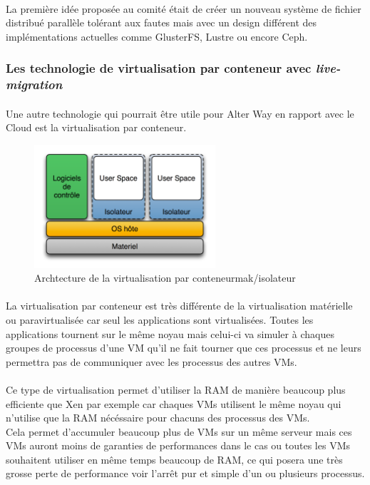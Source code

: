\paragraph*{}
La première idée proposée au comité était de créer un nouveau système de fichier distribué parallèle tolérant aux fautes mais avec un design différent des implémentations actuelles
comme GlusterFS, Lustre ou encore Ceph.


\subsubsection{Les technologie de virtualisation par conteneur avec \emph{live-migration}}
\paragraph*{}
Une autre technologie qui pourrait être utile pour Alter Way en rapport avec le Cloud est la virtualisation par conteneur.

\begin{figure}[H]
\centering
\includegraphics[width=0.6\textwidth]{resource/img/Diagramme_ArchiIsolateur}
\caption{Archtecture de la virtualisation par conteneurmak/isolateur}
\end{figure}

\paragraph*{}
La virtualisation par conteneur est très différente de la virtualisation matérielle ou paravirtualisée car seul les applications sont virtualisées.
Toutes les applications tournent sur le même noyau mais celui-ci va simuler à chaques groupes de processus d'une VM qu'il ne fait tourner que ces processus
et ne leurs permettra pas de communiquer avec les processus des autres VMs.

\paragraph*{}
Ce type de virtualisation permet d'utiliser la RAM de manière beaucoup plus efficiente que Xen par exemple car chaques VMs utilisent le même noyau qui n'utilise
que la RAM nécéssaire pour chacuns des processus des VMs.
\\
Cela permet d'accumuler beaucoup plus de VMs sur un même serveur mais ces VMs auront moins de garanties de performances dans le cas ou toutes les VMs souhaitent utiliser
en même temps beaucoup de RAM, ce qui posera une très grosse perte de performance voir l'arrêt pur et simple d'un ou plusieurs processus.

